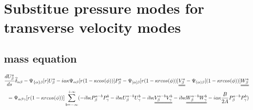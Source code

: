 \documentclass{Note}
\begin{document}
\section{Substitue pressure modes for transverse velocity modes}
\subsection{mass equation}
\begin{equation}
\begin{aligned}
{d U_\beta^a \over d s}\widehat{\delta }_{\alpha\beta}-\Psi_{\{\alpha\}\beta}[r]U_\beta^a-ia \kappa \Psi_{\alpha\beta}[r(1-\kappa cos(\phi))] P_\beta^a -\Psi_{[\alpha]\beta}[ r(1-\kappa r cos(\phi))]\uuline{V_\beta^a}-\Psi_{(\alpha)\beta}[ (1-\kappa r cos(\phi))]\uuline{W_\beta^a}\\
=\Psi_{\alpha\beta\gamma}[r(1-\kappa r cos(\phi))] \sum_{b=-\infty}^{+\infty}(-ib\kappa P_\beta^{a-b} P_\gamma^{b}-ib\kappa U_\beta^{a-b} U_\gamma^{b}-ib\kappa \uuline{V_\beta^{a-b} V_\gamma^{b}}-ib\kappa \uuline{ W_\beta^{a-b} W_\gamma^{b}}-ia\kappa  {B\over {2A}}P_\beta^{a-b}P_\gamma^{b})\\
\end{aligned}
\end{equation}
\end{document}
